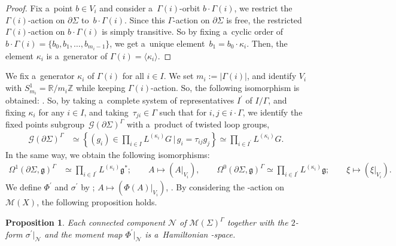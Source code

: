 \documentclass[pdftex]{sigma}
\numberwithin{equation}{section}
\newtheorem{Proposition}[Theorem]{Proposition}
\theoremstyle{definition}
\newcommand{\bR}{\mathbb{R}}
\newcommand{\bZ}{\mathbb{Z}}
\begin{document}
\begin{proof}
 Fix a~point $b \in V_i$ and consider a~$\Gamma(i)$-orbit $b \cdot \Gamma(i)$, we restrict the $\Gamma(i)$-action on $\partial \Sigma$ to~$b \cdot \Gamma(i)$.
 Since this $\Gamma$-action on $\partial \Sigma$ is free, the restricted $\Gamma(i) $-action on $b \cdot \Gamma(i)$ is simply transitive.
 So by fixing a~cyclic order of $b \cdot \Gamma(i) =\{b_0, b_1, \dots, b_{m_i-1}\}$, we get a~unique element~$b_1 = b_0 \cdot \kappa_i$.
 Then, the element $\kappa_i$ is a~generator of $\Gamma(i) = \langle \kappa_i \rangle$.
\end{proof}

We fix a~generator $\kappa_i$ of $\Gamma(i)$ for all $i \in I$.
We set $m_i := | \Gamma(i)|$, and identify $V_i$ with $S^{1}_{m_i} = \bR / m_i \bZ$ while keeping $\Gamma(i)$-action.
So, the following isomorphism is obtained:
.
So, by taking a~complete system of representatives $I^{\prime}$ of $I/\Gamma$, and fixing $\kappa_i$ for any $i \in I$,
and taking~${\tau_{ji} \in \Gamma }$ such that  for $i, j \in i\cdot \Gamma$,
we identify the fixed points subgroup~$\mathcal{G}(\partial \Sigma)^{\Gamma}$ with a~product of twisted loop groups,
\begin{align*}
 \mathcal{G}(\partial \Sigma)^{\Gamma} &\simeq \left\{(g_i) \in \underset{i \in I}{\prod} L^{(\kappa_i)}G\,\bigg|\, g_i = \tau_{ij} g_j\right\} \simeq \underset{i \in I^{\prime}}{\prod} L^{(\kappa_i)}G.
\end{align*}
In the same way, we obtain the following isomorphisms:
\begin{align*}
 \Omega^{1}(\partial \Sigma, \mathfrak{g})^{\Gamma} &\simeq \underset{i \in I^{\prime}}{\prod} L^{(\kappa_i)}\mathfrak{g}^{*};\qquad A \mapsto (A|_{V_i}), \qquad
 \Omega^{0}(\partial \Sigma, \mathfrak{g})^{\Gamma} \simeq \underset{i \in I^{\prime}}{\prod} L^{(\kappa_i)}\mathfrak{g};\qquad \xi \mapsto (\xi|_{V_i}).
\end{align*}
We define $\Phi^{\prime}$ and $\sigma^{\prime}$ by
; $ A \mapsto (\Phi(A)|_{V_i})$, .
By considering the -action on $\mathcal{M}(X)$, the following proposition holds.

\begin{Proposition}
 Each connected component $\mathcal{N}$ of $\mathcal{M}(\Sigma)^{\Gamma}$ together with the $2$-form $\sigma^{\prime}|_{\mathcal{N}}$ and the moment map $\Phi^{\prime}|_{\mathcal{N}}$ is a~Hamiltonian -space.
\end{Proposition}
\end{document}

